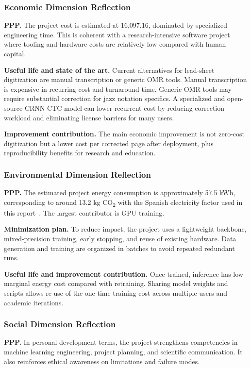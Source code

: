 \documentclass[11pt, a4paper]{article}
\begin{document}
\subsubsection{Economic Dimension Reflection}
\textbf{PPP.} The project cost is estimated at \EUR{}16,097.16, dominated by specialized engineering time. This is coherent with a research-intensive software project where tooling and hardware costs are relatively low compared with human capital.

\textbf{Useful life and state of the art.} Current alternatives for lead-sheet digitization are manual transcription or generic OMR tools. Manual transcription is expensive in recurring cost and turnaround time. Generic OMR tools may require substantial correction for jazz notation specifics. A specialized and open-source CRNN-CTC model can lower recurrent cost by reducing correction workload and eliminating license barriers for many users.

\textbf{Improvement contribution.} The main economic improvement is not zero-cost digitization but a lower cost per corrected page after deployment, plus reproducibility benefits for research and education.

\subsubsection{Environmental Dimension Reflection}
\textbf{PPP.} The estimated project energy consumption is approximately 57.5 kWh, corresponding to around 13.2 kg CO\textsubscript{2} with the Spanish electricity factor used in this report~\cite{reeInformeSistemaElectrico2024,mitecoFactorEmision2025}. The largest contributor is GPU training.

\textbf{Minimization plan.} To reduce impact, the project uses a lightweight backbone, mixed-precision training, early stopping, and reuse of existing hardware. Data generation and training are organized in batches to avoid repeated redundant runs.

\textbf{Useful life and improvement contribution.} Once trained, inference has low marginal energy cost compared with retraining. Sharing model weights and scripts allows re-use of the one-time training cost across multiple users and academic iterations.

\subsubsection{Social Dimension Reflection}
\textbf{PPP.} In personal development terms, the project strengthens competencies in machine learning engineering, project planning, and scientific communication. It also reinforces ethical awareness on limitations and failure modes.
\end{document}
